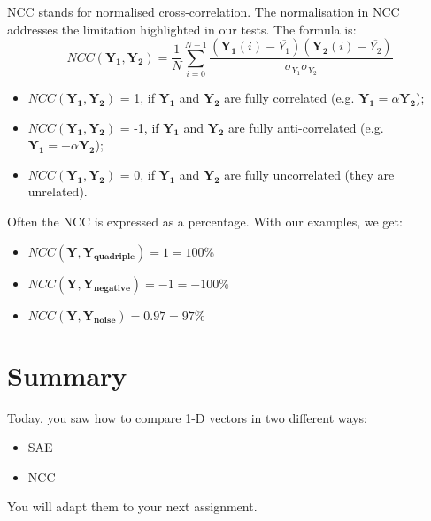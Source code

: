 \documentclass[english,a4paper,12pt,oneside]{article}
\begin{document}
NCC stands for normalised cross-correlation. 
The normalisation in NCC addresses the limitation highlighted in our tests. 
The formula is:
\begin{equation}
NCC(\mathbf{Y_1}, \mathbf{Y_2}) = \frac{1}{N}\sum^{N-1}_{i=0} \frac{(\mathbf{Y_1}(i)-\overline{Y_1})(\mathbf{Y_2}(i)-\overline{Y_2})}{\sigma_{Y_1}\sigma_{Y_2}}
\end{equation}
\begin{itemize}
\item $NCC(\mathbf{Y_1}, \mathbf{Y_2})$ = 1, if $\mathbf{Y_1}$ and $\mathbf{Y_2}$ are fully correlated (e.g. $\mathbf{Y_1} = \alpha \mathbf{Y_2}$);
\item $NCC(\mathbf{Y_1}, \mathbf{Y_2})$ = -1, if $\mathbf{Y_1}$ and $\mathbf{Y_2}$ are fully anti-correlated (e.g. $\mathbf{Y_1} = -\alpha \mathbf{Y_2}$);
\item $NCC(\mathbf{Y_1}, \mathbf{Y_2})$ = 0, if $\mathbf{Y_1}$ and $\mathbf{Y_2}$ are fully uncorrelated (they are unrelated).
\end{itemize}
Often the NCC is expressed as a percentage. 
With our examples, we get:
\begin{itemize}
\item $NCC(\mathbf{Y}, \mathbf{Y_{quadriple}}) = 1 = 100\%$
\item $NCC(\mathbf{Y}, \mathbf{Y_{negative}}) = -1 = -100\%$
\item $NCC(\mathbf{Y}, \mathbf{Y_{noise}}) =  0.97 = 97\%$
\end{itemize}


\section*{Summary}

Today, you saw how to compare 1-D vectors in two different ways:
\begin{itemize}
\item SAE
\item NCC
\end{itemize}
You will adapt them to your next assignment.

\end{document}
